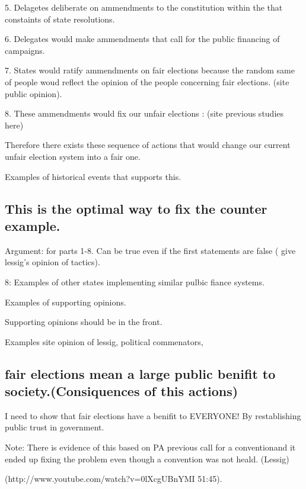 \documentclass[11pt]{article} %
\begin{document}
\begin{enumerate}
5.  Delagetes deliberate on ammendments to the constitution within the that constaints of state resolutions.  

6. Delegates would make ammendments that call for the public financing of campaigns.

7.  States would ratify ammendments on fair elections because the random same of people woud reflect the opinion of the people concerning fair elections. (site public opinion).

8. These ammendments would fix our unfair elections : (site previous studies here)


Therefore there exists these sequence of actions that would change our current unfair election system into a fair one. 

Examples of historical events that supports this. 



\subsection{This is the optimal way to fix the counter example.}

Argument: for parts 1-8.  Can be true even if the first statements are false ( give lessig's opinion of tactics). 

8:  Examples of other states implementing similar pulbic fiance systems. 

Examples of supporting opinions.

Supporting opinions should be in the front. 

Examples site opinion of lessig, political commenators, 

\subsection{fair elections mean a large public benifit to society.(Consiquences of this actions)}

I need to show that fair elections have a benifit to EVERYONE! By restablishing public trust in government. 


Note:  There is evidence of this based on PA previous call for a conventionand it ended up fixing the problem even though a convention was not heald. (Lessig)


(http://www.youtube.com/watch?v=0lXcgUBnYMI   51:45).




\end{enumerate}
\end{document}
